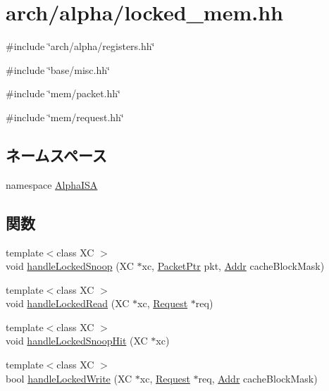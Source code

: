 \hypertarget{alpha_2locked__mem_8hh}{
\section{arch/alpha/locked\_\-mem.hh}
\label{alpha_2locked__mem_8hh}
}
{\ttfamily \#include \char`\"{}arch/alpha/registers.hh\char`\"{}}\par
{\ttfamily \#include \char`\"{}base/misc.hh\char`\"{}}\par
{\ttfamily \#include \char`\"{}mem/packet.hh\char`\"{}}\par
{\ttfamily \#include \char`\"{}mem/request.hh\char`\"{}}\par
\subsection*{ネームスペース}
\begin{DoxyCompactItemize}
\item 
namespace \hyperlink{namespaceAlphaISA}{AlphaISA}
\end{DoxyCompactItemize}
\subsection*{関数}
\begin{DoxyCompactItemize}
\item 
{\footnotesize template$<$class XC $>$ }\\void \hyperlink{namespaceAlphaISA_aae6ad66df5dfd5de14b36293aaf2e7f1}{handleLockedSnoop} (XC $\ast$xc, \hyperlink{classPacket}{PacketPtr} pkt, \hyperlink{base_2types_8hh_af1bb03d6a4ee096394a6749f0a169232}{Addr} cacheBlockMask)
\item 
{\footnotesize template$<$class XC $>$ }\\void \hyperlink{namespaceAlphaISA_a00333a272d42606a01cc33c81999a58b}{handleLockedRead} (XC $\ast$xc, \hyperlink{classRequest}{Request} $\ast$req)
\item 
{\footnotesize template$<$class XC $>$ }\\void \hyperlink{namespaceAlphaISA_a300fd7902bc6b2f2407c79f776d92ee8}{handleLockedSnoopHit} (XC $\ast$xc)
\item 
{\footnotesize template$<$class XC $>$ }\\bool \hyperlink{namespaceAlphaISA_a1087208351cf56657581daf8f2f918c8}{handleLockedWrite} (XC $\ast$xc, \hyperlink{classRequest}{Request} $\ast$req, \hyperlink{base_2types_8hh_af1bb03d6a4ee096394a6749f0a169232}{Addr} cacheBlockMask)
\end{DoxyCompactItemize}


